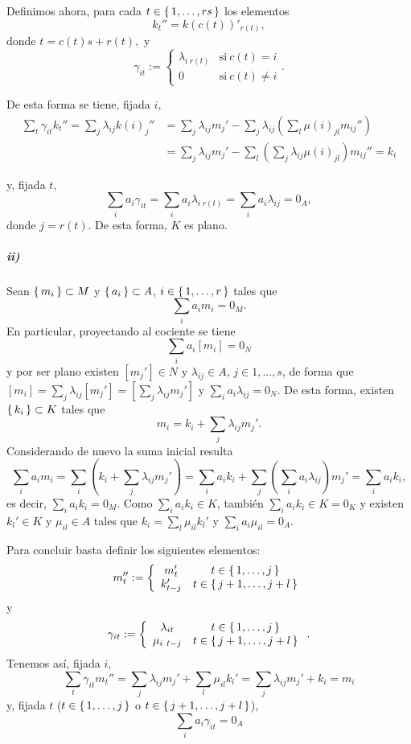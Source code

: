 \documentclass[./ejercicios.tex]{subfiles}
\begin{document}
Definimos ahora, para cada $t\in\set{1,\dots,rs}$ los elementos
$$k_t''=k(c(t))'_{r(t)},$$
donde $t=c(t)s+r(t),$ y
$$\gamma_{it}:=\left\{\begin{array}{cc}
\lambda_{i\ r(t)}&\text{si}\ c(t)=i\\
0&\text{si}\ c(t)\neq i
\end{array}\right..$$

De esta forma se tiene, fijada $i$,
\begin{align*}
\sum_t\gamma_{it}k_t''=\sum_j\lambda_{ij}k(i)_{j}''&=\sum_j\lambda_{ij}m_j'-\sum_j\lambda_{ij}\left(\sum_l\mu(i)_{jl}m_{ij}''\right)\\
&=\sum_j\lambda_{ij}m_j'-\sum_l\left(\sum_j\lambda_{ij}\mu(i)_{jl}\right)m_{ij}''=k_i
\end{align*}

y, fijada $t$,
$$\sum_i a_i\gamma_{it}=\sum_i a_i\lambda_{i\ r(t)}=\sum_i a_i\lambda_{ij}=0_A,$$
donde $j=r(t)$. De esta forma, $K$ es plano.

\subparagraph{ii)} Sean $\set{m_i}\subset M$ y $\set{a_i}\subset A$, $i\in\set{1,\dots,r}$ tales que
$$\sum_{i}a_im_i=0_M.$$
En particular, proyectando al cociente se tiene
$$\sum_{i}a_i[m_i]=0_N$$
y por ser plano existen $[m_j']\in N$ y $\lambda_{ij}\in A$, $j\in{1,\dots,s}$, de forma que $[m_i]=\sum_{j}\lambda_{ij}[m_j']=\left[\sum_{j}\lambda_{ij}m_j'\right]$ y $\sum_ia_i\lambda_{ij}=0_N$. De esta forma, existen $\set{k_i}\subset K$ tales que
$$m_i=k_i+\sum_{j}\lambda_{ij}m_j'.$$
Considerando de nuevo la suma inicial resulta
$$\sum_i a_im_i=\sum_i\left(k_i+\sum_{j}\lambda_{ij}m_j'\right)=\sum_i a_ik_i +\sum_j\left(\sum_ia_i\lambda_{ij}\right)m_j'=\sum_i a_ik_i,$$
es decir, $\sum_i a_ik_i=0_M$. Como $\sum_i a_ik_i\in K$, también $\sum_i a_ik_i\in K=0_K$ y existen $k_l'\in K$ y $\mu_{il}\in A$ tales que $k_i=\sum_l\mu_{il}k_l'$ y $\sum_i a_i\mu_{il}=0_A.$

Para concluir basta definir los siguientes elementos:
$$m_t'':=\left\{\begin{array}{cc}
m_{t}'&t\in\set{1,\dots,j}  \\
k_{t-j}'&t\in\set{j+1,\dots,j+l}
\end{array}\right.$$
y
$$\gamma_{it}:=\left\{\begin{array}{cc}
\lambda_{it}&t\in\set{1,\dots,j}  \\
\mu_{i\ t-j}&t\in\set{j+1,\dots,j+l}
\end{array}\right..$$
Tenemos así, fijada $i$,
$$\sum_t\gamma_{it}m_t''=\sum_{j}\lambda_{ij}m_j'+\sum_l\mu_{il}k_l'=\sum_{j}\lambda_{ij}m_j'+k_i= m_i$$
y, fijada $t$ ($t\in\set{1,\dots,j}$ o $t\in\set{j+1,\dots,j+l}$),
$$\sum_i a_i\gamma_{it}=0_A$$
\end{document}
